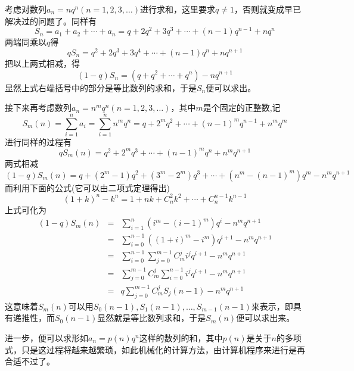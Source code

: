 \begin{example}[错位相减法的一个用途]
  考虑对数列$a_n = n q^n(n=1,2,3,\ldots)$进行求和，这里要求$q \neq 1$，否则就变成早已解决过的问题了。同样有
  \[ S_n = a_1+a_2+\cdots+a_n = q+2q^2+3q^3 + \cdots + (n-1)q^{n-1} + nq^n \]
  两端同乘以$q$得
  \[ qS_n = q^2+2q^3+3q^4 + \cdots + (n-1)q^n + nq^{n+1} \]
  把以上两式相减，得
  \[ (1-q)S_n = (q + q^2 + \cdots + q^n) - n q^{n+1} \]
  显然上式右端括号中的部分是等比数列的求和，于是$S_n$便可以求出。

  接下来再考虑数列$a_n=n^mq^n(n=1,2,3,\ldots)$，其中$m$是个固定的正整数,记
  \[ S_m(n) = \sum_{i=1}^na_i = \sum_{i=1}^n n^m q^n = q + 2^mq^2 + \cdots + (n-1)^mq^{n-1} + n^m q^m \]
  进行同样的过程有
  \[ qS_m(n) = q^2 + 2^mq^3 + \cdots + (n-1)^m q^n + n^m q^{n+1} \]
  两式相减
  \[ (1-q)S_m(n) = q +(2^m-1)q^2 + (3^m-2^m)q^3 + \cdots + (n^m-(n-1)^m)q^m - n^mq^{n+1}  \]
  而利用下面的公式(它可以由二项式定理得出)
  \[ (1+k)^n-k^n = 1+nk+C_n^2k^2 + \cdots + C_n^{n-1}k^{n-1} \]
  上式可化为
  \begin{eqnarray*}
    (1-q)S_m(n) & = & \sum_{i=1}^n(i^m-(i-1)^m)q^i - n^mq^{n+1} \\
                & = & \sum_{i=0}^{n-1}((1+i)^m-i^m)q^{i+1} - n^mq^{n+1} \\
                & = & \sum_{i=0}^{n-1}\sum_{j=0}^{m-1}C_m^ji^jq^{i+1} - n^mq^{n+1} \\
                & = & \sum_{j=0}^{m-1}C_m^j\sum_{i=0}^{n-1}i^jq^{i+1} - n^mq^{n+1} \\
    & = & q\sum_{j=0}^{m-1}C_m^jS_j(n-1) - n^mq^{n+1}
  \end{eqnarray*}
  这意味着$S_m(n)$可以用$S_0(n-1),S_1(n-1),\ldots,S_{m-1}(n-1)$来表示，即具有递推性，而$S_0(n-1)$显然就是等比数列求和，于是$S_m(n)$便可以求出来。

  进一步，便可以求形如$a_n=p(n)q^n$这样的数列的和，其中$p(n)$是关于$n$的多项式，只是这过程将越来越繁琐，如此机械化的计算方法，由计算机程序来进行是再合适不过了。
\end{example}

